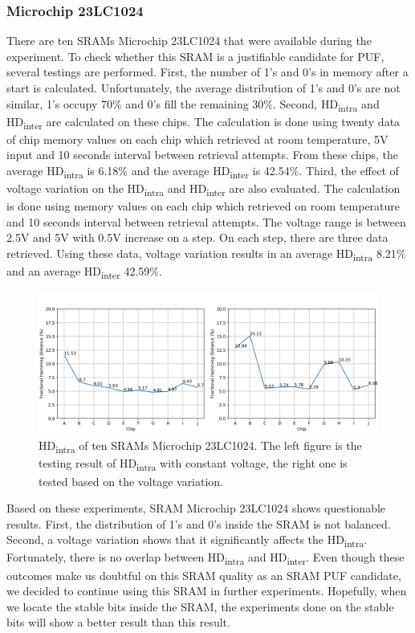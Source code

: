 \subsubsection{Microchip 23LC1024}
There are ten SRAMs Microchip 23LC1024 that were available during the experiment. To check whether this SRAM is a justifiable candidate for PUF, several testings are performed.
First, the number of 1's and 0's in memory after a start is calculated. Unfortunately, the average distribution of 1's and 0's are not similar, 1's occupy 70\% and 0's fill the remaining 30\%.
Second, HD\textsubscript{intra} and HD\textsubscript{inter} are calculated on these chips. The calculation is done using twenty data of chip memory values on each chip which retrieved at room temperature, 5V input and 10 seconds interval between retrieval attempts. From these chips, the average HD\textsubscript{intra} is 6.18\% and the average HD\textsubscript{inter} is 42.54\%.
Third, the effect of voltage variation on the HD\textsubscript{intra} and HD\textsubscript{inter} are also evaluated. The calculation is done using memory values on each chip which retrieved on room temperature and 10 seconds interval between retrieval attempts. The voltage range is between 2.5V and 5V with 0.5V increase on a step. On each step, there are three data retrieved. Using these data, voltage variation results in an average HD\textsubscript{intra} 8.21\% and an average HD\textsubscript{inter} 42.59\%.

\begin{figure}[tph!]
    \centerline{\includegraphics[width={\textwidth}]{images/23lc1024_hd_intra}}
    \caption{HD\textsubscript{intra} of ten SRAMs Microchip 23LC1024. The left figure is the testing result of HD\textsubscript{intra} with constant voltage, the right one is tested based on the voltage variation.}
    \label{fig:23lc1024_hd_intra}
\end{figure}

Based on these experiments, SRAM Microchip 23LC1024 shows questionable results. First, the distribution of 1's and 0's inside the SRAM is not balanced. Second, a voltage variation shows that it significantly affects the  HD\textsubscript{intra}. Fortunately, there is no overlap between HD\textsubscript{intra} and HD\textsubscript{inter}. Even though these outcomes make us doubtful on this SRAM quality as an SRAM PUF candidate, we decided to continue using this SRAM in further experiments. Hopefully, when we locate the stable bits inside the SRAM, the experiments done on the stable bits will show a better result than this result.

